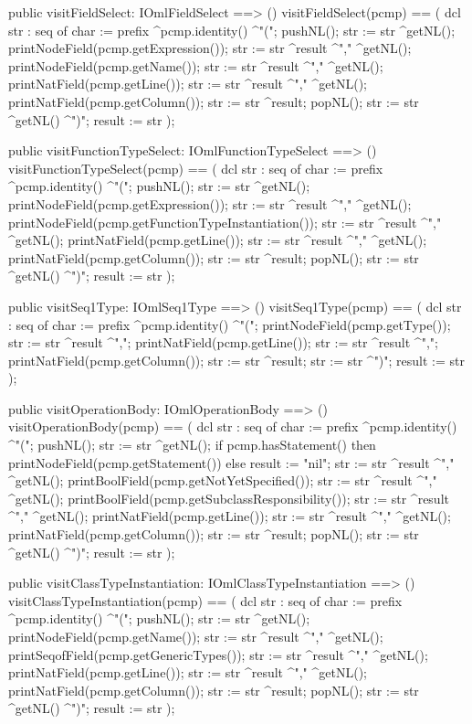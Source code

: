 \begin{vdm_al}
  public visitFieldSelect: IOmlFieldSelect ==> ()
  visitFieldSelect(pcmp) ==
    ( dcl str : seq of char := prefix ^pcmp.identity() ^"(";
      pushNL();
      str := str ^getNL();
      printNodeField(pcmp.getExpression());
      str := str ^result ^"," ^getNL();
      printNodeField(pcmp.getName());
      str := str ^result ^"," ^getNL();
      printNatField(pcmp.getLine());
      str := str ^result ^"," ^getNL();
      printNatField(pcmp.getColumn());
      str := str ^result;
      popNL();
      str := str ^getNL() ^")";
      result := str );

  public visitFunctionTypeSelect: IOmlFunctionTypeSelect ==> ()
  visitFunctionTypeSelect(pcmp) ==
    ( dcl str : seq of char := prefix ^pcmp.identity() ^"(";
      pushNL();
      str := str ^getNL();
      printNodeField(pcmp.getExpression());
      str := str ^result ^"," ^getNL();
      printNodeField(pcmp.getFunctionTypeInstantiation());
      str := str ^result ^"," ^getNL();
      printNatField(pcmp.getLine());
      str := str ^result ^"," ^getNL();
      printNatField(pcmp.getColumn());
      str := str ^result;
      popNL();
      str := str ^getNL() ^")";
      result := str );

  public visitSeq1Type: IOmlSeq1Type ==> ()
  visitSeq1Type(pcmp) ==
    ( dcl str : seq of char := prefix ^pcmp.identity() ^"(";
      printNodeField(pcmp.getType());
      str := str ^result ^",";
      printNatField(pcmp.getLine());
      str := str ^result ^",";
      printNatField(pcmp.getColumn());
      str := str ^result;
      str := str ^")";
      result := str );

  public visitOperationBody: IOmlOperationBody ==> ()
  visitOperationBody(pcmp) ==
    ( dcl str : seq of char := prefix ^pcmp.identity() ^"(";
      pushNL();
      str := str ^getNL();
      if pcmp.hasStatement()
      then printNodeField(pcmp.getStatement())
      else result := "nil";
      str := str ^result ^"," ^getNL();
      printBoolField(pcmp.getNotYetSpecified());
      str := str ^result ^"," ^getNL();
      printBoolField(pcmp.getSubclassResponsibility());
      str := str ^result ^"," ^getNL();
      printNatField(pcmp.getLine());
      str := str ^result ^"," ^getNL();
      printNatField(pcmp.getColumn());
      str := str ^result;
      popNL();
      str := str ^getNL() ^")";
      result := str );

  public visitClassTypeInstantiation: IOmlClassTypeInstantiation ==> ()
  visitClassTypeInstantiation(pcmp) ==
    ( dcl str : seq of char := prefix ^pcmp.identity() ^"(";
      pushNL();
      str := str ^getNL();
      printNodeField(pcmp.getName());
      str := str ^result ^"," ^getNL();
      printSeqofField(pcmp.getGenericTypes());
      str := str ^result ^"," ^getNL();
      printNatField(pcmp.getLine());
      str := str ^result ^"," ^getNL();
      printNatField(pcmp.getColumn());
      str := str ^result;
      popNL();
      str := str ^getNL() ^")";
      result := str );


\end{vdm_al}
